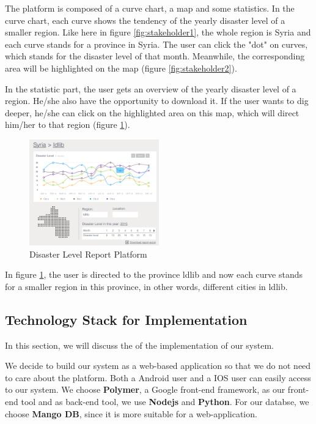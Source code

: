       The platform is composed of a curve chart,
      a map and some statistics.
      In the curve chart,
      each curve shows the tendency of the yearly disaster level of a smaller region.
      Like here in figure \ref{fig:stakeholder1}, 
      the whole region is Syria and each curve stands for a province in Syria.
      The user can click the "dot" on curves,
      which stands for the disaster level of that month.
      Meanwhile, the corresponding area will be highlighted on the map (figure \ref{fig:stakeholder2}).

      In the statistic part,
      the user gets an overview of the yearly disaster level of a region.
      He/she also have the opportunity to download it.
      If the user wants to dig deeper, 
      he/she can click on the highlighted area on this map,
      which will direct him/her to that region (figure \ref{fig:stakeholder3}).

      \begin{figure}[H]
      \centering
      \includegraphics[width=0.5\textwidth]{figures/function-stakeholder-3}
      \caption{Disaster Level Report Platform}
      \label{fig:stakeholder3}
      \end{figure}

      In figure \ref{fig:stakeholder3},
      the user is directed to the province ldlib and now each curve stands for a smaller region in this province,
      in other words, different cities in ldlib.
    
    \subsection{Technology Stack for Implementation}
    In this section, we will discuss the of the implementation of our system. 

    We decide to build our system as a web-based application so that we do not need to care about the platform.
    Both a Android user and a IOS user can easily access to our system. We choose \textbf{Polymer}, a Google front-end framework, as our front-end tool and as back-end tool, we use \textbf{Nodejs} and \textbf{Python}. For our databse, we choose \textbf{Mango DB}, since it is more suitable for a web-application.
